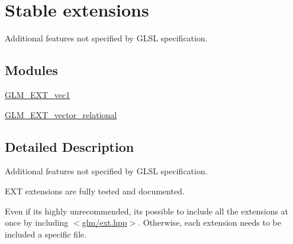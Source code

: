 \hypertarget{group__ext}{}\section{Stable extensions}
\label{group__ext}


Additional features not specified by G\+L\+SL specification.  


\subsection*{Modules}
\begin{DoxyCompactItemize}
\item 
\mbox{\hyperlink{group__ext__vec1}{G\+L\+M\+\_\+\+E\+X\+T\+\_\+vec1}}
\item 
\mbox{\hyperlink{group__ext__vector__relational}{G\+L\+M\+\_\+\+E\+X\+T\+\_\+vector\+\_\+relational}}
\end{DoxyCompactItemize}


\subsection{Detailed Description}
Additional features not specified by G\+L\+SL specification. 

E\+XT extensions are fully tested and documented.

Even if it\textquotesingle{}s highly unrecommended, it\textquotesingle{}s possible to include all the extensions at once by including $<$\mbox{\hyperlink{ext_8hpp}{glm/ext.\+hpp}}$>$. Otherwise, each extension needs to be included a specific file. 